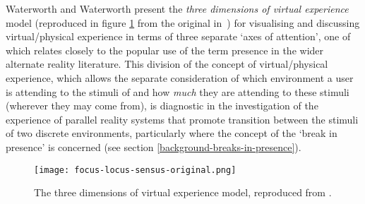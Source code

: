 \newcommand{\absencefootnote}{\footnote{\textbf{Absence} is defined as \textit{``a psychological focus on \ldots\ conceptual processing''}~\cite{Waterworth2001}, as \textit{``presence in an exclusively mental activity''}~\cite{Giuseppe2014}, with total presence (in the above definition) and total absence representing opposite poles along the continuum of the focus of attention axis~\cite{Mantovani2010}.}}

Waterworth and Waterworth present the \textit{three dimensions of virtual experience} model (reproduced in figure \ref{focus-locus-sensus-original} from the original in~\cite{Waterworth2001}) for visualising and discussing virtual/physical experience in terms of three separate `axes of attention', one of which relates closely to the popular use of the term presence in the wider alternate reality literature. This division of the concept of virtual/physical experience, which allows the separate consideration of which environment a user is attending to the stimuli of and how \textit{much} they are attending to these stimuli (wherever they may come from), is diagnostic in the investigation of the experience of parallel reality systems that promote transition between the stimuli of two discrete environments, particularly where the concept of the `break in presence' is concerned (see section \ref{background-breaks-in-presence}).

\begin{figure}[h]
	\begin{center}
		\texttt{[image: focus-locus-sensus-original.png]}
		\caption{The three dimensions of virtual experience model, reproduced from \cite{Waterworth2001}.}
		\label{focus-locus-sensus-original}
	\end{center}	
\end{figure}

